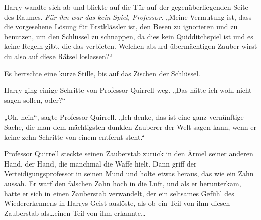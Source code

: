 Harry wandte sich ab und blickte auf die Tür auf der gegenüberliegenden Seite des Raumes.
\emph{Für ihn war das kein Spiel, Professor.}
„Meine Vermutung ist, dass die vorgesehene Lösung für Erstklässler ist, den Besen zu ignorieren und  zu benutzen, um den Schlüssel zu schnappen, da dies kein Quidditchspiel ist und es keine Regeln gibt, die das verbieten. Welchen absurd übermächtigen Zauber wirst du also auf diese Rätsel loslassen?“

Es herrschte eine kurze Stille, bis auf das Zischen der Schlüssel.

Harry ging einige Schritte von Professor Quirrell weg.
„Das hätte ich wohl nicht sagen sollen, oder?“

„Oh, nein“, sagte Professor Quirrell.
„Ich denke, das ist eine ganz vernünftige Sache, die man dem mächtigsten dunklen Zauberer der Welt sagen kann, wenn er keine zehn Schritte von einem entfernt steht.“

Professor Quirrell steckte seinen Zauberstab zurück in den Ärmel seiner anderen Hand, der Hand, die manchmal die Waffe hielt.
Dann griff der Verteidigungsprofessor in seinen Mund und holte etwas heraus, das wie ein Zahn aussah. Er warf den falschen Zahn hoch in die Luft, und als er herunterkam, hatte er sich in einen Zauberstab verwandelt, der ein seltsames Gefühl des Wiedererkennens in Harrys Geist auslöste, als ob ein Teil von ihm diesen Zauberstab als…einen Teil von ihm erkannte…

